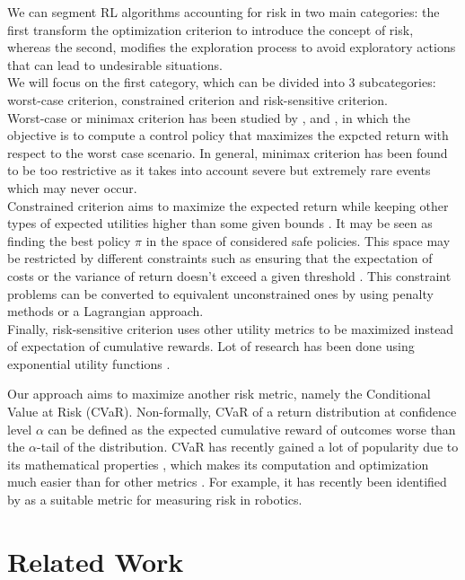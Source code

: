 We can segment RL algorithms accounting for risk in two main categories: the first transform 
the optimization criterion to introduce the concept of risk, whereas the second, modifies
the exploration process to avoid exploratory actions that can lead to undesirable situations.\\
We will focus on the first category, which can be divided into 3 subcategories: worst-case
criterion, constrained criterion and risk-sensitive criterion.\\
Worst-case or minimax criterion has been studied by \citet{Heger1994}, 
\citet{Coraluppi1997} and \citet{Coraluppi1999},
in which the objective is to compute a control policy that maximizes the expcted return
with respect to the worst case scenario. In general, minimax criterion has
been found to be too restrictive as it takes into
account severe but extremely rare events which may never occur.\\
Constrained criterion  aims to maximize the expected return while keeping
other types of expected utilities higher than some given bounds \citep{Altman1993}.
It may be seen as finding the best policy $\pi$ in the space of considered safe policies.
This space may be restricted by different constraints such as ensuring that
the expectation of costs \citep{Geibel2006} or the variance of return doesn't exceed
a given threshold \citep{Tamar2012}.
This constraint problems can be converted to equivalent unconstrained ones by using
penalty methods or a Lagrangian approach.\\
Finally, risk-sensitive criterion uses other utility metrics to be maximized instead of
expectation of cumulative rewards.
Lot of research has been done using exponential utility functions
\citep{Howard1972,Chung1987}.

Our approach aims to maximize
another risk metric, namely the Conditional Value at Risk (CVaR).
Non-formally, CVaR of a return distribution at confidence level $\alpha$ can be defined as the expected
cumulative reward of outcomes worse than the $\alpha$-tail of the distribution.
CVaR has recently gained a lot of popularity due to its mathematical properties \citep{Artzner1999},
which makes its computation and optimization much easier than for other metrics  \citep{Rockafellar2000}.
For example, 
it has recently been identified by \citet{Majumdar2020} as a suitable metric
for measuring risk in robotics.

\section{Related Work}

